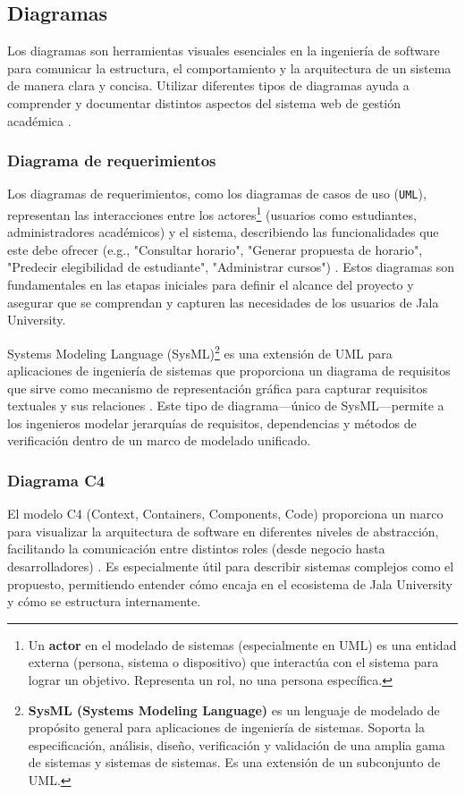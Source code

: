 \subsection{Diagramas}
Los diagramas son herramientas visuales esenciales en la ingeniería de software para comunicar la estructura, el comportamiento y la arquitectura de un sistema de manera clara y concisa.
Utilizar diferentes tipos de diagramas ayuda a comprender y documentar distintos aspectos del sistema web de gestión académica \parencite{Fowler2003}.

\subsubsection{Diagrama de requerimientos}
Los diagramas de requerimientos, como los diagramas de casos de uso (\texttt{UML}), representan las interacciones entre los actores\footnote{Un \textbf{actor} en el modelado de sistemas (especialmente en UML) es una entidad externa (persona, sistema o dispositivo) que interactúa con el sistema para lograr un objetivo.
Representa un rol, no una persona específica.} (usuarios como estudiantes, administradores académicos) y el sistema, describiendo las funcionalidades que este debe ofrecer (e.g., "Consultar horario", "Generar propuesta de horario", "Predecir elegibilidad de estudiante", "Administrar cursos") \parencite{Jacobson1992}.
Estos diagramas son fundamentales en las etapas iniciales para definir el alcance del proyecto y asegurar que se comprendan y capturen las necesidades de los usuarios de Jala University.

Systems Modeling Language (SysML)\footnote{\textbf{SysML (Systems Modeling Language)} es un lenguaje de modelado de propósito general para aplicaciones de ingeniería de sistemas.
Soporta la especificación, análisis, diseño, verificación y validación de una amplia gama de sistemas y sistemas de sistemas.
Es una extensión de un subconjunto de UML.} es una extensión de UML para aplicaciones de ingeniería de sistemas que proporciona un diagrama de requisitos que sirve como mecanismo de representación gráfica para capturar requisitos textuales y sus relaciones \parencite{Friedenthal2014}.
Este tipo de diagrama—único de SysML—permite a los ingenieros modelar jerarquías de requisitos, dependencias y métodos de verificación dentro de un marco de modelado unificado.

\subsubsection{Diagrama C4}
El modelo C4 (Context, Containers, Components, Code) proporciona un marco para visualizar la arquitectura de software en diferentes niveles de abstracción, facilitando la comunicación entre distintos roles (desde negocio hasta desarrolladores) \parencite{BrownC4}.
Es especialmente útil para describir sistemas complejos como el propuesto, permitiendo entender cómo encaja en el ecosistema de Jala University y cómo se estructura internamente.

